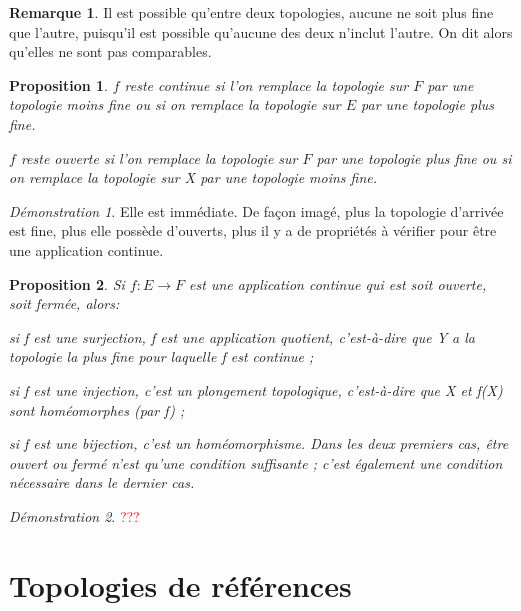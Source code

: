 \documentclass[a4paper, 11pt, french]{book}
\newenvironment{itemise}{\itemize}{\enditemize}
\theoremstyle{plain} %
\newtheorem{proposition}{Proposition}
\theoremstyle{definition} %
\newtheorem{remarque}{Remarque}
\theoremstyle{remark} %
\newtheorem*{demonstration}{Démonstration}
\newcommand{\1}{\mathds{1}}
\begin{document}
\begin{remarque}
	Il est possible qu'entre deux topologies, aucune ne soit plus fine que l'autre, puisqu'il est possible qu'aucune des deux n'inclut l'autre.
	On dit alors qu'elles ne sont pas comparables.
\end{remarque}

\begin{proposition} 
	\text{}
	\begin{itemise}
		\item $f$ reste continue si l'on remplace la topologie sur $F$ par une topologie moins fine ou si on remplace la topologie sur $E$ par une topologie plus fine.
		\item $f$ reste ouverte si l'on remplace la topologie sur $F$ par une topologie plus fine ou si on remplace la topologie sur X par une topologie moins fine.
	\end{itemise}
\end{proposition}

\begin{demonstration}
	Elle est immédiate.
	De façon imagé, plus la topologie d'arrivée est fine, plus elle possède d'ouverts, plus il y a de propriétés à vérifier pour être une application continue.
\end{demonstration}

\begin{proposition}
	Si $f\colon E\rightarrow F$ est une application continue qui est soit ouverte, soit fermée, alors:
	\begin{itemise}
		\item si f est une surjection, f est une application quotient, c'est-à-dire que Y a la topologie la plus fine pour laquelle f est continue ;
		\item si f est une injection, c'est un plongement topologique, c'est-à-dire que X et f(X) sont homéomorphes (par f) ;
		\item si f est une bijection, c'est un homéomorphisme.
	\end{itemise}
	Dans les deux premiers cas, être ouvert ou fermé n'est qu'une condition suffisante ; c'est également une condition nécessaire dans le dernier cas.
\end{proposition}

\begin{demonstration}
	\textcolor{red}{???}
\end{demonstration}

\chapter{Topologies de références}
\end{document}
